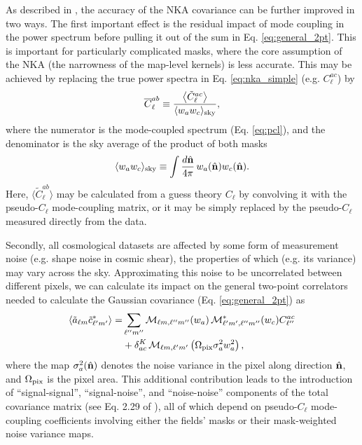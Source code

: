 \documentclass[aps,twocolumn, superscriptaddress, english, nofootinbib, 10pt]{revtex4-2}
\newcommand{\nv}{\hat{\bf n}}
\begin{document}
    As described in \cite{2010.09717}, the accuracy of the NKA covariance can be further improved in two ways. The first important effect is the residual impact of mode coupling in the power spectrum before pulling it out of the sum in Eq. \ref{eq:general_2pt}. This is important for particularly complicated masks, where the core assumption of the NKA (the narrowness of the map-level kernels) is less accurate. This may be achieved by replacing the true power spectra in Eq. \ref{eq:nka_simple} (e.g. $C_\ell^{ac}$) by
    \begin{equation}\label{eq:clbar0}
      \overline{C}^{ab}_\ell\equiv\frac{\left\langle \tilde{C}^{ac}_\ell\right\rangle}{\langle w_aw_c\rangle_{\rm sky}},
    \end{equation}
    where the numerator is the mode-coupled spectrum (Eq. \ref{eq:pcl}), and the denominator is the sky average of the product of both masks
    \begin{equation}
      \langle w_aw_c\rangle_{\rm sky}\equiv\int\frac{d\nv}{4\pi}\,w_a(\nv)w_c(\nv).
    \end{equation}
    Here, $\langle\tilde{C}^{ab}_\ell\rangle$ may be calculated from a guess theory $C_\ell$ by convolving it with the pseudo-$C_\ell$ mode-coupling matrix, or it may be simply replaced by the pseudo-$C_\ell$ measured directly from the data.

    Secondly, all cosmological datasets are affected by some form of measurement noise (e.g. shape noise in cosmic shear), the properties of which (e.g. its variance) may vary across the sky. Approximating this noise to be uncorrelated between different pixels, we can calculate its impact on the general two-point correlators needed to calculate the Gaussian covariance (Eq. \ref{eq:general_2pt}) as
    \begin{align}\label{eq:general_2pt_wnoise}
      \langle\tilde{a}_{\ell m}\tilde{c}_{\ell'm'}^*\rangle
      =&\sum_{\ell''m''}{\cal M}_{\ell m,\ell''m''}(w_a)\,{\cal M}^{*}_{\ell' m',\ell''m''}(w_c)C_{\ell''}^{ac}\\\nonumber
      &+\delta_{ac}^K\,{\cal M}_{\ell m,\ell'm'}\left(\Omega_{\rm pix}\sigma_a^2w_a^2\right),
    \end{align}
    where the map $\sigma_a^2(\nv)$ denotes the noise variance in the pixel along direction $\nv$, and $\Omega_{\rm pix}$ is the pixel area. This additional contribution leads to the introduction of ``signal-signal'', ``signal-noise'', and ``noise-noise'' components of the total covariance matrix (see Eq. 2.29 of \cite{2010.09717}), all of which depend on pseudo-$C_\ell$ mode-coupling coefficients involving either the fields' masks or their mask-weighted noise variance maps.
\end{document}
